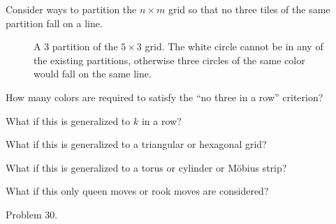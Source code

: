 \documentclass{article}
\begin{document}
  Consider ways to partition the $n \times m$ grid so that no three tiles of the
  same partition fall on a line.
  \begin{figure}[!h]
    \centering
    \caption{
      A $3$ partition of the $5 \times 3$ grid. The white circle cannot be in
      any of the existing partitions, otherwise three circles of the same
      color would fall on the same line.
    }
  \end{figure}

\begin{question}
  How many colors are required to satisfy the ``no three in a row'' criterion?
\end{question}
\begin{related}
  \item What if this is generalized to $k$ in a row?
  \item What if this is generalized to a triangular or hexagonal grid?
  \item What if this is generalized to a torus or cylinder or M\"obius strip?
  \item What if this only queen moves or rook moves are considered?
\end{related}
\begin{references}
  \item Problem 30.
\end{references}
\end{document}
